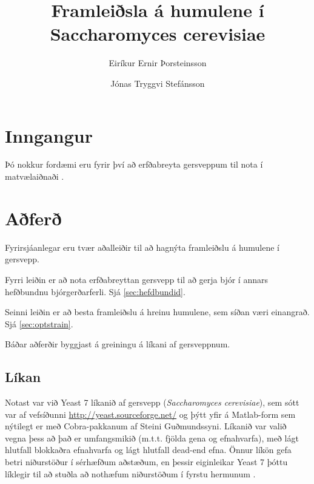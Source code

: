 \documentclass[11pt]{article}
\title{Framleiðsla á humulene í Saccharomyces cerevisiae}
\author{Eiríkur Ernir Þorsteinsson \and Jónas Tryggvi Stefánsson}
\begin{document}
\maketitle

\setlength{\columnsep}{1cm}

\begin{abstract}
\lipsum[150]
\end{abstract}

\vspace{1cm}
\begin{multicols}{2}

\section{Inngangur}

Þó nokkur fordæmi eru fyrir því að erfðabreyta gersveppum til nota í matvælaiðnaði \cite{dequin2001potential}.

\section{Aðferð}
Fyrirsjáanlegar eru tvær aðalleiðir til að hagnýta framleiðslu á humulene í gersvepp.

Fyrri leiðin er að nota erfðabreyttan gersvepp til að gerja bjór í annars hefðbundnu bjórgerðarferli. Sjá \ref{sec:hefdbundid}.

Seinni leiðin er að besta framleiðslu á hreinu humulene, sem síðan væri einangrað. Sjá \ref{sec:optstrain}.

Báðar aðferðir byggjast á greiningu á líkani af gersveppnum.
\subsection{Líkan}
Notast var við Yeast 7 líkanið af gersvepp (\emph{Saccharomyces cerevisiae}), sem sótt var af vefsíðunni \url{http://yeast.sourceforge.net/} og þýtt yfir á Matlab-form sem nýtilegt er með Cobra-pakkanum af Steini Guðmundssyni. Líkanið var valið vegna þess að það er umfangsmikið (m.t.t. fjölda gena og efnahvarfa), með lágt hlutfall blokkaðra efnahvarfa og lágt hlutfall dead-end efna. Önnur líkön gefa betri niðurstöður í sérhæfðum aðstæðum, en þessir eiginleikar Yeast 7 þóttu líklegir til að stuðla að nothæfum niðurstöðum í fyrstu hermunum \cite{heavner2015comparative}.


\end{multicols}
\end{document}

